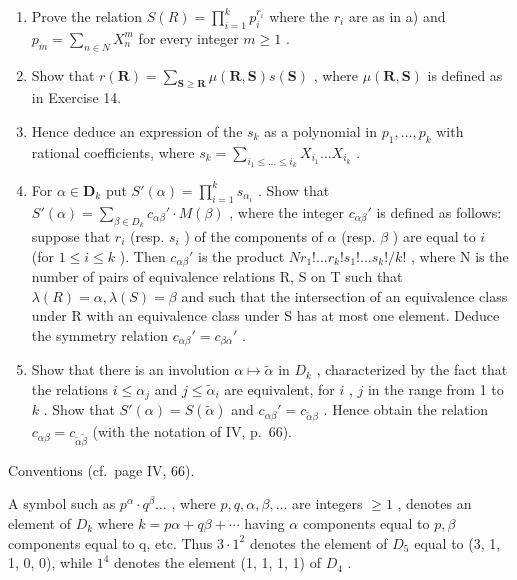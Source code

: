 \begin{enumerate}
\def\labelenumi{\alph{enumi})}
\setcounter{enumi}{1}
\item
  Prove the relation \(S(R) = \prod_{i=1}^{k} p_i^{r_i}\) where the \(r_i\) are as in a) and \(p_m = \sum_{n \in N} X_n^m\) for every integer \(m \geqslant 1\) .
\item
  Show that \(r(\mathbf{R}) = \sum_{\mathbf{S} \geqslant \mathbf{R}} \mu(\mathbf{R}, \mathbf{S}) s(\mathbf{S})\) , where \(\mu(\mathbf{R}, \mathbf{S})\) is defined as in Exercise 14.
\item
  Hence deduce an expression of the \(s_k\) as a polynomial in \(p_1, \ldots, p_k\) with rational coefficients, where \(s_k = \sum_{i_1 \leq \ldots \leq i_k} X_{i_1} \ldots X_{i_k}\) .
\item
  For \(\alpha \in \mathbf{D}_k\) put \(S'(\alpha) = \prod_{i=1}^{k} s_{\alpha_i}\) . Show that \(S'(\alpha) = \sum_{\beta \in D_k} c_{\alpha\beta}' \cdot M(\beta)\) , where the integer \(c_{\alpha\beta}'\) is defined as follows: suppose that \(r_i\) (resp. \(s_i\) ) of the components of \(\alpha\) (resp. \(\beta\) ) are equal to \(i\) (for \(1 \leqslant i \leqslant k\) ). Then \(c_{\alpha\beta}'\) is the product \(Nr_1!... r_k!s_1!... s_k!/k!\) , where N is the number of pairs of equivalence relations R, S on T such that \(\lambda(R) = \alpha, \lambda(S) = \beta\) and such that the intersection of an equivalence class under R with an equivalence class under S has at most one element. Deduce the symmetry relation \(c_{\alpha\beta}' = c_{\beta\alpha}'\) .
\item
  Show that there is an involution \(\alpha \mapsto \tilde{\alpha}\) in \(D_k\) , characterized by the fact that the relations \(i \leqslant \alpha_j\) and \(j \leqslant \tilde{\alpha}_i\) are equivalent, for \(i\) , \(j\) in the range from 1 to \(k\) . Show that \(S'(\alpha) = S(\tilde{\alpha})\) and \(c_{\alpha\beta}' = c_{\tilde{\alpha}\beta}\) . Hence obtain the relation \(c_{\alpha\beta} = c_{\tilde{\alpha}\tilde{\beta}}\) (with the notation of IV, p.~66).
\end{enumerate}


Conventions (cf.~page IV, 66).

A symbol such as \(p^{\alpha} \cdot q^{\beta} \ldots\) , where \(p, q, \alpha, \beta, \ldots\) are integers \(\geqslant 1\) , denotes an element of \(D_{k}\) where \(k = p\alpha + q\beta + \cdots\) having \(\alpha\) components equal to \(p, \beta\) components equal to q, etc. Thus \(3 \cdot 1^{2}\) denotes the element of \(D_{5}\) equal to (3, 1, 1, 0, 0), while \(1^{4}\) denotes the element (1, 1, 1, 1) of \(D_{4}\) .

